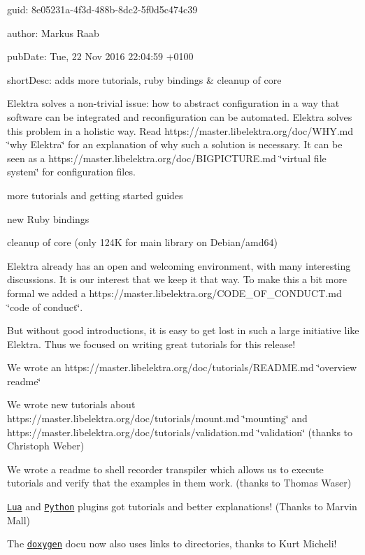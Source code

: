
\begin{DoxyItemize}
\item guid\+: 8e05231a-\/4f3d-\/488b-\/8dc2-\/5f0d5c474c39
\item author\+: Markus Raab
\item pub\+Date\+: Tue, 22 Nov 2016 22\+:04\+:59 +0100
\item short\+Desc\+: adds more tutorials, ruby bindings \& cleanup of core
\end{DoxyItemize}

Elektra solves a non-\/trivial issue\+: how to abstract configuration in a way that software can be integrated and reconfiguration can be automated. Elektra solves this problem in a holistic way. Read https\+://master.libelektra.\+org/doc/\+W\+HY.md \char`\"{}why Elektra\char`\"{} for an explanation of why such a solution is necessary. It can be seen as a https\+://master.libelektra.\+org/doc/\+B\+I\+G\+P\+I\+C\+T\+U\+RE.md \char`\"{}virtual file system\char`\"{} for configuration files.


\begin{DoxyItemize}
\item more tutorials and getting started guides
\item new Ruby bindings
\item cleanup of core (only 124K for main library on Debian/amd64)
\end{DoxyItemize}

Elektra already has an open and welcoming environment, with many interesting discussions. It is our interest that we keep it that way. To make this a bit more formal we added a https\+://master.libelektra.\+org/\+C\+O\+D\+E\+\_\+\+O\+F\+\_\+\+C\+O\+N\+D\+U\+CT.md \char`\"{}code of
conduct\char`\"{}.

But without good introductions, it is easy to get lost in such a large initiative like Elektra. Thus we focused on writing great tutorials for this release!


\begin{DoxyItemize}
\item We wrote an https\+://master.libelektra.\+org/doc/tutorials/\+R\+E\+A\+D\+ME.md \char`\"{}overview readme\char`\"{}
\item We wrote new tutorials about https\+://master.libelektra.\+org/doc/tutorials/mount.md \char`\"{}mounting\char`\"{} and https\+://master.libelektra.\+org/doc/tutorials/validation.md \char`\"{}validation\char`\"{} (thanks to Christoph Weber)
\item We wrote a readme to shell recorder transpiler which allows us to execute tutorials and verify that the examples in them work. (thanks to Thomas Waser)
\item \href{https://master.libelektra.org/src/plugins/lua}{\tt Lua} and \href{https://master.libelektra.org/src/plugins/python}{\tt Python} plugins got tutorials and better explanations! (Thanks to Marvin Mall)
\item The \href{https://doc.libelektra.org/api/0.8.19/html/}{\tt doxygen} docu now also uses links to directories, thanks to Kurt Micheli!
\end{DoxyItemize}

